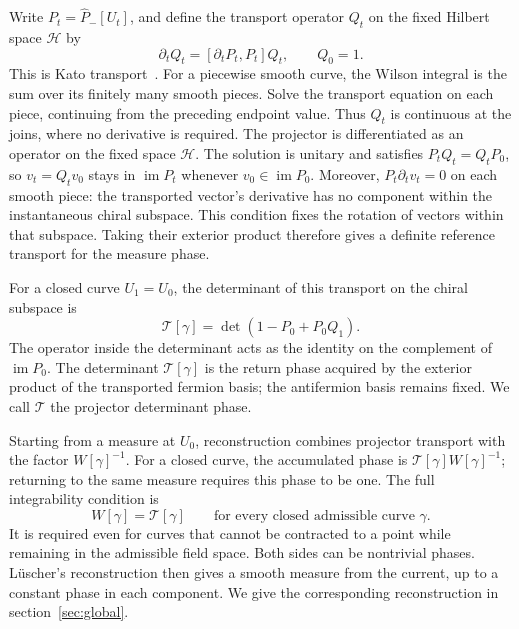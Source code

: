 \documentclass[11pt,a4paper]{article}
\theoremstyle{remark}
\DeclareMathOperator{\im}{im}
\begin{document}
Write \(P_t=\widehat P_-[U_t]\), and define the transport
operator \(Q_t\) on the fixed Hilbert space \(\mathcal H\) by
\begin{equation}
 \partial_tQ_t=[\partial_tP_t,P_t]Q_t,\qquad Q_0=1.
 \label{eq:projector-transport}
\end{equation}
This is Kato transport~\cite{Kato1950}. For a piecewise smooth
curve, the Wilson integral is the sum over its finitely many smooth pieces.
Solve the transport equation on each piece, continuing from the
preceding endpoint value. Thus $Q_t$ is continuous at the joins,
where no derivative is required. The projector is differentiated
as an operator on the fixed space $\mathcal H$.
The solution is unitary and satisfies \(P_tQ_t=Q_tP_0\), so
\(v_t=Q_tv_0\) stays in \(\im P_t\) whenever
\(v_0\in\im P_0\). Moreover, $P_t\partial_t v_t=0$ on each smooth piece:
the transported vector's derivative has no component within the
instantaneous chiral subspace. This condition fixes the rotation of
vectors within that subspace. Taking their exterior product therefore gives
a definite reference transport for the measure phase.

For a closed curve \(U_1=U_0\), the determinant of this
transport on the chiral subspace is
\begin{equation}
 \mathcal T[\gamma]=\det(1-P_0+P_0Q_1).
 \label{eq:twist}
\end{equation}
The operator inside the determinant acts as the identity
on the complement of \(\im P_0\). The determinant \(\mathcal T[\gamma]\)
is the return phase acquired by the exterior product of the
transported fermion basis;
the antifermion basis remains fixed. We call \(\mathcal T\)
the projector determinant phase.

Starting from a measure at \(U_0\), reconstruction combines
projector transport with the factor \(W[\gamma]^{-1}\).
For a closed curve, the accumulated phase is
\(\mathcal T[\gamma]W[\gamma]^{-1}\); returning to the
same measure requires this phase to be one.
The full integrability condition is
\begin{equation}
 W[\gamma]=\mathcal T[\gamma]
 \qquad\text{for every closed admissible curve }\gamma.
 \label{eq:integrability}
\end{equation}
It is required even for curves that cannot be contracted to
a point while remaining in the admissible field space.
Both sides can be nontrivial phases.
L\"uscher's reconstruction then gives a smooth measure
from the current, up to a constant phase in each component.
We give the corresponding reconstruction in
section~\ref{sec:global}.
\end{document}
